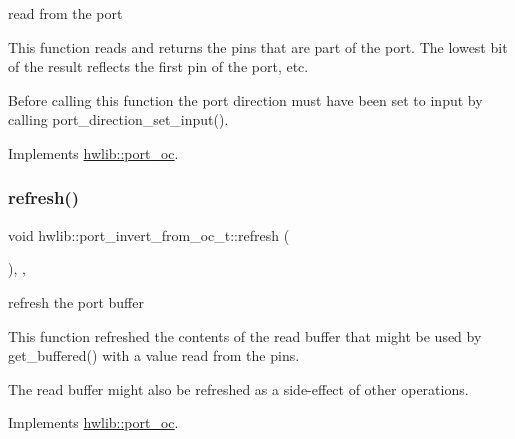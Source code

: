 read from the port

This function reads and returns the pins that are part of the port. The lowest bit of the result reflects the first pin of the port, etc.

Before calling this function the port direction must have been set to input by calling port\+\_\+direction\+\_\+set\+\_\+input(). 

Implements \hyperlink{classhwlib_1_1port__oc_a422b02326f14332df44863adced18427}{hwlib\+::port\+\_\+oc}.

\mbox{\label{classhwlib_1_1port__invert__from__oc__t_a72a8110fbfc6115c279e9340869420d7}} 
\subsubsection{\texorpdfstring{refresh()}{refresh()}}
{\footnotesize\ttfamily void hwlib\+::port\+\_\+invert\+\_\+from\+\_\+oc\+\_\+t\+::refresh (\begin{DoxyParamCaption}{ }\end{DoxyParamCaption})\hspace{0.3cm}{\ttfamily [inline]}, {\ttfamily [override]}, {\ttfamily [virtual]}}





refresh the port buffer

This function refreshed the contents of the read buffer that might be used by get\+\_\+buffered() with a value read from the pins.

The read buffer might also be refreshed as a side-\/effect of other operations. 

Implements \hyperlink{classhwlib_1_1port__oc_aa4488183f5cf241ba48ad4dd1a89e42a}{hwlib\+::port\+\_\+oc}.

\mbox{\label{classhwlib_1_1port__invert__from__oc__t_a7c59288ec311931116f47f88dfd1d1f0}} 

